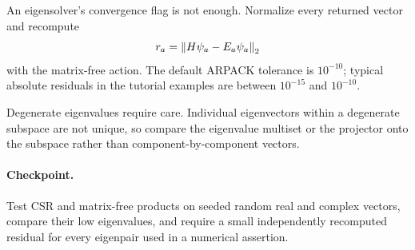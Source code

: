 An eigensolver's convergence flag is not enough.  Normalize every returned
vector and recompute
\begin{equation}
r_a=\left\lVert H\psi_a-E_a\psi_a \right\rVert_2
\label{eq:residual}
\end{equation}
with the matrix-free action.  The default ARPACK tolerance is $10^{-10}$;
typical absolute residuals in the tutorial examples are between $10^{-15}$
and $10^{-10}$.



Degenerate eigenvalues require care.  Individual eigenvectors within a
degenerate subspace are not unique, so compare the eigenvalue multiset or the
projector onto the subspace rather than component-by-component vectors.

\paragraph{Checkpoint.}
Test CSR and matrix-free products on seeded random real and complex vectors,
compare their low eigenvalues, and require a small independently recomputed
residual for every eigenpair used in a numerical assertion.

